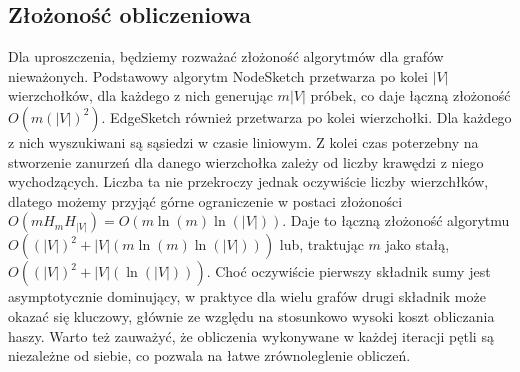     \subsection{Złożoność obliczeniowa}
    Dla uproszczenia, będziemy rozważać złożoność algorytmów dla grafów nieważonych. Podstawowy algorytm NodeSketch przetwarza po kolei $|V|$ wierzchołków, dla każdego z nich generując $m|V|$ próbek, co daje łączną złożoność $O(m(|V|)^2)$. EdgeSketch również przetwarza po kolei wierzchołki. Dla każdego z nich wyszukiwani są sąsiedzi w czasie liniowym. Z kolei czas poterzebny na stworzenie zanurzeń dla danego wierzchołka zależy od liczby krawędzi z niego wychodzących. Liczba ta nie przekroczy jednak oczywiście liczby wierzchłków, dlatego możemy przyjąć górne ograniczenie w postaci złożoności $O(m H_m H_{|V|}) = O(m \ln(m) \ln(|V|))$. Daje to łączną złożoność algorytmu $O((|V|)^2 + |V|(m \ln(m) \ln(|V|)))$ lub, traktując $m$ jako stałą, $O((|V|)^2 + |V|(\ln(|V|)))$. Choć oczywiście pierwszy składnik sumy jest asymptotycznie dominujący, w praktyce dla wielu grafów drugi składnik może okazać się kluczowy, głównie ze względu na stosunkowo wysoki koszt obliczania haszy. Warto też zauważyć, że obliczenia wykonywane w każdej iteracji pętli są niezależne od siebie, co pozwala na łatwe zrównoleglenie obliczeń. 